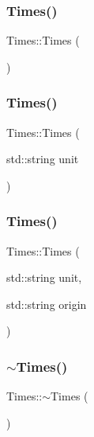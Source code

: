 \subsubsection{\texorpdfstring{Times()}{Times()}\hspace{0.1cm}{\footnotesize\ttfamily [1/3]}}
{\footnotesize\ttfamily Times\+::\+Times (\begin{DoxyParamCaption}{ }\end{DoxyParamCaption})}

\mbox{\label{class_times_a49de9639125c133a6b0e4351eaa422b5}} 
\subsubsection{\texorpdfstring{Times()}{Times()}\hspace{0.1cm}{\footnotesize\ttfamily [2/3]}}
{\footnotesize\ttfamily Times\+::\+Times (\begin{DoxyParamCaption}\item[{std\+::string}]{unit }\end{DoxyParamCaption})}

\mbox{\label{class_times_aec85fed5d7741b4ea2445874b3ecadfe}} 
\subsubsection{\texorpdfstring{Times()}{Times()}\hspace{0.1cm}{\footnotesize\ttfamily [3/3]}}
{\footnotesize\ttfamily Times\+::\+Times (\begin{DoxyParamCaption}\item[{std\+::string}]{unit,  }\item[{std\+::string}]{origin }\end{DoxyParamCaption})}

\mbox{\label{class_times_a7989831a284e9d10e3ae96ceb2349a3c}} 
\subsubsection{\texorpdfstring{$\sim$\+Times()}{~Times()}}
{\footnotesize\ttfamily Times\+::$\sim$\+Times (\begin{DoxyParamCaption}{ }\end{DoxyParamCaption})\hspace{0.3cm}{\ttfamily [virtual]}}



